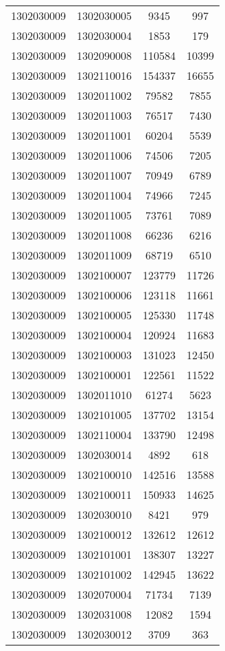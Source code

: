 \begin{longtable}[h]{llcc}
		1302030009 & 1302030005 & 9345 & 997\\
		1302030009 & 1302030004 & 1853 & 179\\
		1302030009 & 1302090008 & 110584 & 10399\\
		1302030009 & 1302110016 & 154337 & 16655\\
		1302030009 & 1302011002 & 79582 & 7855\\
		1302030009 & 1302011003 & 76517 & 7430\\
		1302030009 & 1302011001 & 60204 & 5539\\
		1302030009 & 1302011006 & 74506 & 7205\\
		1302030009 & 1302011007 & 70949 & 6789\\
		1302030009 & 1302011004 & 74966 & 7245\\
		1302030009 & 1302011005 & 73761 & 7089\\
		1302030009 & 1302011008 & 66236 & 6216\\
		1302030009 & 1302011009 & 68719 & 6510\\
		1302030009 & 1302100007 & 123779 & 11726\\
		1302030009 & 1302100006 & 123118 & 11661\\
		1302030009 & 1302100005 & 125330 & 11748\\
		1302030009 & 1302100004 & 120924 & 11683\\
		1302030009 & 1302100003 & 131023 & 12450\\
		1302030009 & 1302100001 & 122561 & 11522\\
		1302030009 & 1302011010 & 61274 & 5623\\
		1302030009 & 1302101005 & 137702 & 13154\\
		1302030009 & 1302110004 & 133790 & 12498\\
		1302030009 & 1302030014 & 4892 & 618\\
		1302030009 & 1302100010 & 142516 & 13588\\
		1302030009 & 1302100011 & 150933 & 14625\\
		1302030009 & 1302030010 & 8421 & 979\\
		1302030009 & 1302100012 & 132612 & 12612\\
		1302030009 & 1302101001 & 138307 & 13227\\
		1302030009 & 1302101002 & 142945 & 13622\\
		1302030009 & 1302070004 & 71734 & 7139\\
		1302030009 & 1302031008 & 12082 & 1594\\
		1302030009 & 1302030012 & 3709 & 363\\

\end{longtable}

